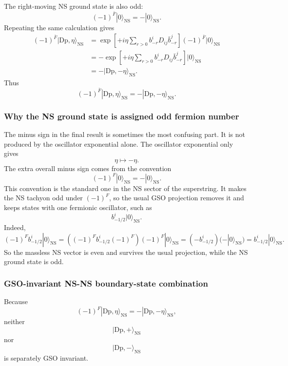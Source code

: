 \documentclass[
  10pt,
  a4paper,
  openany]{book}
\begin{document}
The right-moving NS ground state is also odd: \[
(-1)^{\bar F}|0\rangle_{\mathrm{NS}}
=
-|0\rangle_{\mathrm{NS}}.
\] Repeating the same calculation gives \[
\begin{aligned}
(-1)^{\bar F}|\mathrm{Dp},\eta\rangle_{\mathrm{NS}}
&=
\exp\left[
+i\eta
\sum_{r>0}b^i_{-r}D_{ij}\bar b^j_{-r}
\right]
(-1)^{\bar F}|0\rangle_{\mathrm{NS}}\\
&=
-
\exp\left[
+i\eta
\sum_{r>0}b^i_{-r}D_{ij}\bar b^j_{-r}
\right]
|0\rangle_{\mathrm{NS}}\\
&=
-|\mathrm{Dp},-\eta\rangle_{\mathrm{NS}}.
\end{aligned}
\] Thus \[
\boxed{
(-1)^{\bar F}|\mathrm{Dp},\eta\rangle_{\mathrm{NS}}
=
-|\mathrm{Dp},-\eta\rangle_{\mathrm{NS}}.
}
\]

\subsubsection{Why the NS ground state is assigned odd fermion
number}\label{why-the-ns-ground-state-is-assigned-odd-fermion-number}

The minus sign in the final result is sometimes the most confusing part.
It is not produced by the oscillator exponential alone. The oscillator
exponential only gives \[
\eta\mapsto -\eta.
\] The extra overall minus sign comes from the convention \[
(-1)^F|0\rangle_{\mathrm{NS}}
=
-|0\rangle_{\mathrm{NS}}.
\] This convention is the standard one in the NS sector of the
superstring. It makes the NS tachyon odd under \((-1)^F\), so the usual
GSO projection removes it and keeps states with one fermionic
oscillator, such as \[
b_{-1/2}^i|0\rangle_{\mathrm{NS}}.
\] Indeed, \[
(-1)^F b_{-1/2}^i|0\rangle_{\mathrm{NS}}
=
\left((-1)^F b_{-1/2}^i(-1)^F\right)
(-1)^F|0\rangle_{\mathrm{NS}}
=
(-b_{-1/2}^i)(-|0\rangle_{\mathrm{NS}})
=
b_{-1/2}^i|0\rangle_{\mathrm{NS}}.
\] So the massless NS vector is even and survives the usual projection,
while the NS ground state is odd.

\subsubsection{GSO-invariant NS-NS boundary-state
combination}\label{gso-invariant-ns-ns-boundary-state-combination}

Because \[
(-1)^F|\mathrm{Dp},\eta\rangle_{\mathrm{NS}}
=
-|\mathrm{Dp},-\eta\rangle_{\mathrm{NS}},
\] neither \[
|\mathrm{Dp},+\rangle_{\mathrm{NS}}
\] nor \[
|\mathrm{Dp},-\rangle_{\mathrm{NS}}
\] is separately GSO invariant.
\end{document}
